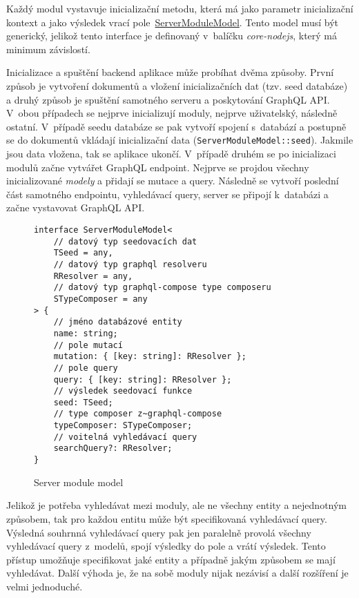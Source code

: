 Každý modul vystavuje inicializační metodu, která má jako parametr inicializační kontext a jako výsledek vrací pole~\hyperref[code:server_module_model]{ServerModuleModel}. Tento model musí být generický, jelikož tento interface je definovaný v~balíčku \emph{core-nodejs}, který má minimum závislostí.

Inicializace a spuštění backend aplikace může probíhat dvěma způsoby. První způsob je vytvoření dokumentů a vložení inicializačních dat (tzv. seed databáze) a druhý způsob je spuštění samotného serveru a poskytování GraphQL API. V~obou případech se nejprve inicializují moduly, nejprve uživatelský, následně ostatní. V~případě seedu databáze se pak vytvoří spojení s~databází a postupně se do dokumentů vkládají inicializační data (\texttt{ServerModuleModel::seed}). Jakmile jsou data vložena, tak se aplikace ukončí. V~případě druhém se po inicializaci modulů začne vytvářet GraphQL endpoint. Nejprve se projdou všechny inicializované \emph{modely} a přidají se mutace a query. Následně se vytvoří poslední část samotného endpointu, vyhledávací query, server se připojí k~databázi a začne vystavovat GraphQL API.

\begin{figure}
    \centering
    \begin{verbatim}
interface ServerModuleModel<
    // datový typ seedovacích dat    
    TSeed = any,
    // datový typ graphql resolveru
    RResolver = any,
    // datový typ graphql-compose type composeru
    STypeComposer = any
> {
    // jméno databázové entity    
    name: string;
    // pole mutací
    mutation: { [key: string]: RResolver };
    // pole query
    query: { [key: string]: RResolver };
    // výsledek seedovací funkce
    seed: TSeed;
    // type composer z~graphql-compose 
    typeComposer: STypeComposer;
    // voitelná vyhledávací query
    searchQuery?: RResolver;
}
    \end{verbatim}
    \caption{Server module model}
    \label{code:server_module_model}
\end{figure}

\pagebreak

Jelikož je potřeba vyhledávat mezi moduly, ale ne všechny entity a nejednotným způsobem, tak pro každou entitu může být specifikovaná vyhledávací query. Výsledná souhrnná vyhledávací query pak jen paralelně provolá všechny vyhledávací query z~modelů, spojí výsledky do pole a vrátí výsledek. Tento přístup umožňuje specifikovat jaké entity a případně jakým způsobem se mají vyhledávat. Další výhoda je, že na sobě moduly nijak nezávisí a další rozšíření je velmi jednoduché.
